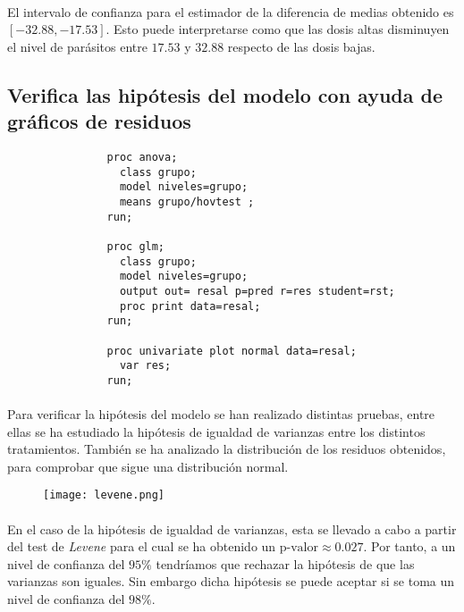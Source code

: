 \documentclass{article}
\begin{document}
      \paragraph{}
      El intervalo de confianza para el estimador de la diferencia de medias obtenido es $[-32.88, -17.53]$. Esto puede interpretarse como que las dosis altas disminuyen el nivel de parásitos entre $17.53$ y $32.88$ respecto de las dosis bajas.

    \subsection{Verifica las hipótesis del modelo con ayuda de gráficos de residuos}

      \begin{figure}[h]
        \centering
        \begin{verbatim}
          proc anova;
            class grupo;
            model niveles=grupo;
            means grupo/hovtest ;
          run;

          proc glm;
            class grupo;
            model niveles=grupo;
            output out= resal p=pred r=res student=rst;
            proc print data=resal;
          run;

          proc univariate plot normal data=resal;
            var res;
          run;
        \end{verbatim}
        \label{code:sas_8}
      \end{figure}

      \paragraph{}
      Para verificar la hipótesis del modelo se han realizado distintas pruebas, entre ellas se ha estudiado la hipótesis de igualdad de varianzas entre los distintos tratamientos. También se ha analizado la distribución de los residuos obtenidos, para comprobar que sigue una distribución normal.

      \begin{figure}[H]
        \centering
        \texttt{[image: levene.png]}
      \end{figure}

      \paragraph{}
      En el caso de la hipótesis de igualdad de varianzas, esta se llevado a cabo a partir del test de \emph{Levene} para el cual se ha obtenido un $\text{p-valor} \approx 0.027$. Por tanto, a un nivel de confianza del $95\%$ tendríamos que rechazar la hipótesis de que las varianzas son iguales. Sin embargo dicha hipótesis se puede aceptar si se toma un nivel de confianza del $98\%$.
\end{document}
